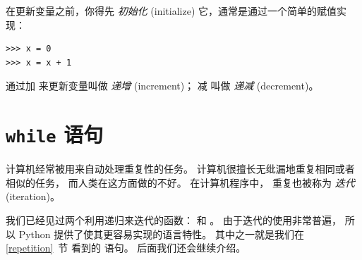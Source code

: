 在更新变量之前，你得先 {\em 初始化} (initialize) 它，通常是通过一个简单的赋值实现：

\begin{lstlisting}
>>> x = 0
>>> x = x + 1
\end{lstlisting}

%

通过加  来更新变量叫做 {\em 递增} (increment)； 减  叫做 {\em 递减} (decrement)。
  
  


\section{{\tt while} 语句}

  
  



计算机经常被用来自动处理重复性的任务。
计算机很擅长无纰漏地重复相同或者相似的任务， 而人类在这方面做的不好。
在计算机程序中， 重复也被称为 {\em 迭代} (iteration)。


我们已经见过两个利用递归来迭代的函数：  和  。 由于迭代的使用非常普遍， 所以 Python 提供了使其更容易实现的语言特性。 其中之一就是我们在 \ref{repetition}~节 看到的  语句。 后面我们还会继续介绍。




